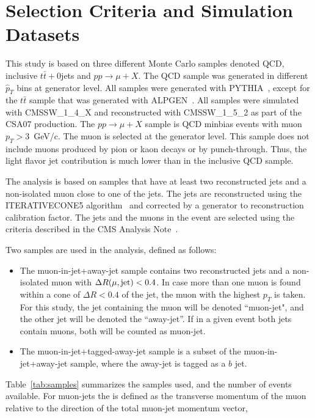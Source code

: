 \section{Selection Criteria and Simulation Datasets}
\label{sec:samples}

This study is based on three different Monte Carlo samples denoted QCD, 
inclusive $t\bar{t}+0$jets and $pp\rightarrow \mu +X$. The QCD sample 
was generated in different $\hat{p}_T $ bins at generator level. All
samples were generated with PYTHIA~\cite{ref:pythia}, except for the $t\bar{t} $ sample 
that was generated with ALPGEN~\cite{ref:alpgen}. All samples were simulated with 
CMSSW\_1\_4\_X and reconstructed with CMSSW\_1\_5\_2 as part of the CSA07
production. The $pp\rightarrow \mu +X $ sample is QCD minbias events with
muon $p_T > 3$~GeV/c. The muon is selected at the generator level. This
sample does not include muons produced by pion or kaon decays or by
punch-through. Thus, the light flavor jet contribution is much
lower than in the inclusive QCD sample.

The analysis is based on samples that have at least two reconstructed jets 
and a non-isolated muon close to one of the jets. The jets are reconstructed 
using the ITERATIVECONE5 algorithm~\cite{ref:iterativecone5} and corrected by a generator to 
reconstruction calibration factor. The jets and the muons in the event are
selected using the criteria described in the CMS Analysis 
Note~\cite{ref:btag_oldnote}.

Two samples are used in the analysis, defined as follows:
\begin{itemize} 
\item The  muon-in-jet+away-jet sample contains two reconstructed jets
and a non-isolated muon with $\Delta R(\mu,{\rm jet})<0.4$. In case 
more than one muon is found within a cone of $\Delta R<0.4$ of the jet, the 
muon with the highest $p_T$ is taken. For this study, the jet containing the 
muon will be denoted ``muon-jet",  and the other jet will be denoted the 
``away-jet''. If in a given event both jets contain muons, both will be 
counted as muon-jet. 
\item The muon-in-jet+tagged-away-jet sample is a subset of the 
muon-in-jet+away-jet sample, where the away-jet is tagged as a $b$ jet. 
\end{itemize}

Table~\ref{tab:samples} summarizes the samples used, and the number 
of events available.
For muon-jets the \ptrel is defined as the transverse momentum of the muon 
relative to the direction of the total muon-jet momentum vector,
 
